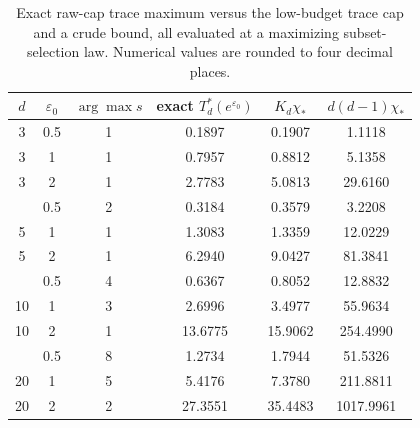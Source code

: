 \documentclass[11pt]{amsart}
\theoremstyle{definition}
\begin{document}
\begin{table}[ht]
\centering
\small
\caption{Exact raw-cap trace maximum versus the low-budget trace cap and a crude bound, all evaluated at a maximizing subset-selection law. Numerical values are rounded to four decimal places.}
\label{tab:raw-cap}
\begin{tabular}{@{}cccccc@{}}
\toprule
$d$ & $\varepsilon_0$ & $\arg\max s$ & exact $T_d^*(e^{\varepsilon_0})$ & $K_d\chi_*$ & $d(d-1)\chi_*$ \\
\midrule
3 & 0.5 & 1 & 0.1897 & 0.1907 & 1.1118 \\
3 & 1 & 1 & 0.7957 & 0.8812 & 5.1358 \\
3 & 2 & 1 & 2.7783 & 5.0813 & 29.6160 \\
\addlinespace
5 & 0.5 & 2 & 0.3184 & 0.3579 & 3.2208 \\
5 & 1 & 1 & 1.3083 & 1.3359 & 12.0229 \\
5 & 2 & 1 & 6.2940 & 9.0427 & 81.3841 \\
\addlinespace
10 & 0.5 & 4 & 0.6367 & 0.8052 & 12.8832 \\
10 & 1 & 3 & 2.6996 & 3.4977 & 55.9634 \\
10 & 2 & 1 & 13.6775 & 15.9062 & 254.4990 \\
\addlinespace
20 & 0.5 & 8 & 1.2734 & 1.7944 & 51.5326 \\
20 & 1 & 5 & 5.4176 & 7.3780 & 211.8811 \\
20 & 2 & 2 & 27.3551 & 35.4483 & 1017.9961 \\
\bottomrule
\end{tabular}
\end{table}
\end{document}
